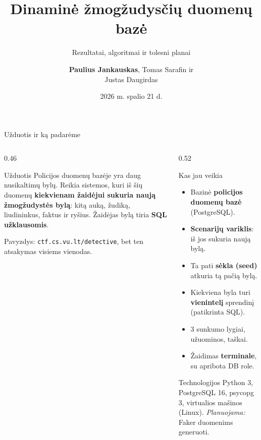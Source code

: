 \documentclass[hyperref={breaklinks=true},fleqn,mathserif]{beamer}
\title[Dinaminė žmogžudysčių duomenų bazė]{Dinaminė žmogžudysčių duomenų bazė}
\subtitle{Rezultatai, algoritmai ir tolesni planai}
\author[\textit{et al.}]{\textbf{Paulius Jankauskas}, Tomas Sarafin ir \\ Justas Daugirdas}
\institute{Vilniaus universitetas \\ Matematikos ir informatikos fakultetas }
\date{2026 m. spalio 21 d.}
\begin{document}
\frame[plain]{\titlepage}

\begin{frame}{Užduotis ir ką padarėme}

\begin{columns}[T]
\begin{column}{0.46\textwidth}
\begin{block}{Užduotis}
\footnotesize
Policijos duomenų bazėje yra daug nusikaltimų bylų. Reikia sistemos, kuri iš šių duomenų
\textbf{kiekvienam žaidėjui sukuria naują žmogžudystės bylą}: kitą auką, žudiką, liudininkus,
faktus ir ryšius. Žaidėjas bylą tiria \textbf{SQL užklausomis}.
\par\medskip
Pavyzdys: \texttt{ctf.cs.vu.lt/detective}, bet ten atsakymas visiems vienodas.
\end{block}
\end{column}

\begin{column}{0.52\textwidth}
\begin{exampleblock}{Kas jau veikia}
\footnotesize
\begin{itemize}
    \setlength{\itemsep}{2pt}
    \item Bazinė \textbf{policijos duomenų bazė} (PostgreSQL).
    \item \textbf{Scenarijų variklis}: iš jos sukuria naują bylą.
    \item Ta pati \textbf{sėkla (seed)} atkuria tą pačią bylą.
    \item Kiekviena byla turi \textbf{vienintelį} sprendinį (patikrinta SQL).
    \item 3 sunkumo lygiai, užuominos, taškai.
    \item Žaidimas \textbf{terminale}, su apribota DB role.
\end{itemize}
\end{exampleblock}

\begin{block}{Technologijos}
\footnotesize Python 3, PostgreSQL 16, psycopg 3, virtualios mašinos (Linux).
\textit{Planuojama:} Faker duomenims generuoti.
\end{block}
\end{column}
\end{columns}

\end{frame}
\end{document}
